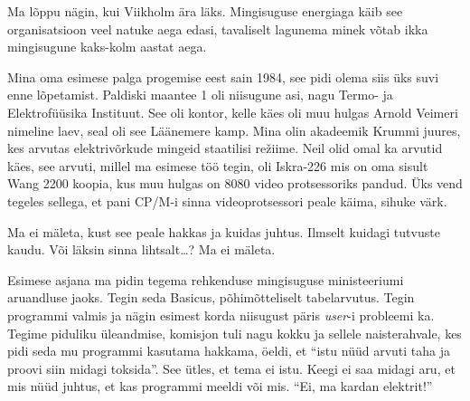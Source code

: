 
Ma lõppu nägin, kui Viikholm ära läks. Mingisuguse energiaga käib see 
organisatsioon veel natuke aega edasi, tavaliselt lagunema minek võtab ikka 
mingisugune kaks-kolm aastat aega.


Mina oma esimese palga progemise eest sain 1984,  see pidi olema siis 
üks suvi enne lõpetamist. Paldiski maantee 1 oli niisugune asi, nagu Termo- ja 
Elektrofüüsika Instituut. See 
oli kontor, kelle käes oli muu hulgas Arnold Veimeri nimeline laev, seal 
oli see Läänemere kamp. Mina olin akadeemik Krummi 
juures, 
kes arvutas elektrivõrkude mingeid staatilisi režiime. Neil olid omal  ka 
arvutid käes, see arvuti, millel ma esimese töö tegin, oli 
Iskra-226 mis on oma sisult Wang 2200 koopia, kus muu hulgas on 
8080 video protsessoriks pandud. Üks vend tegeles sellega, et 
pani CP/M-i sinna videoprotsessori peale käima, sihuke värk. 


Ma ei mäleta, kust see  peale hakkas ja kuidas juhtus. Ilmselt kuidagi tutvuste 
kaudu. Või läksin sinna lihtsalt\ldots?  Ma ei mäleta.


Esimese asjana ma pidin tegema rehkenduse mingisuguse 
ministeeriumi aruandluse jaoks. Tegin seda Basicus, 
põhimõtteliselt tabelarvutus. Tegin  programmi valmis ja  nägin esimest korda 
niisugust päris \emph{user}-i probleemi ka. Tegime piduliku üleandmise, komisjon tuli 
nagu kokku ja sellele naisterahvale, kes pidi seda mu 
programmi kasutama hakkama, öeldi, et \enquote{istu nüüd arvuti taha ja proovi 
siin midagi toksida}. See ütles, et tema ei istu. Keegi ei saa midagi aru, 
et mis nüüd juhtus, et kas programmi meeldi või mis. \enquote{Ei, ma kardan 
elektrit!}


